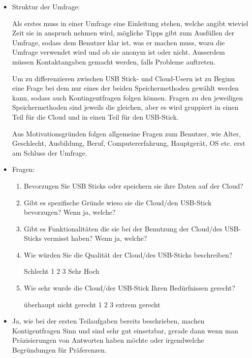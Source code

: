 \begin{itemize}

    \item Struktur der Umfrage:

    Als erstes muss in einer Umfrage eine Einleitung stehen, welche angibt wieviel
    Zeit sie in anspruch nehmen wird, mögliche Tipps gibt zum Ausfüllen der Umfrage,
    sodass dem Benutzer klar ist, was er machen muss, wozu die Umfrage verwendet wird
    und ob sie anonym ist oder nicht. Ausserdem müssen Kontaktangaben gemacht werden,
    falls Probleme auftreten. 

    Um zu differenzieren zwischen USB Stick- und Cloud-Usern ist zu Beginn eine Frage bei dem nur eines
    der beiden Speichermethoden gewählt werden kann, sodass auch Kontingentfragen folgen können.
    Fragen zu den jeweiligen Speichermethoden sind jeweils die gleichen, aber es wird
    gruppiert in einen Teil für die Cloud und in einen Teil für den USB-Stick.

    Aus Motivationsgründen folgen allgemeine Fragen zum Benutzer, wie Alter, Geschlecht, 
    Ausbildung, Beruf, Computererfahrung, Hauptgerät, OS etc. erst am Schluss der Umfrage.

    \item Fragen:
    
    \begin{enumerate}[label=\arabic*)]
        \item Bevorzugen Sie USB Sticks oder speichern sie ihre Daten auf der Cloud?
        \item Gibt es spezifische Gründe wieso sie die Cloud/den USB-Stick bevorzugen? Wenn ja, welche?
        \item Gibt es Funktionalitäten die sie bei der Benutzung der Cloud/des USB-Sticks vermisst haben? Wenn ja, welche?
        \item Wie würden Sie die Qualität der Cloud/des USB-Sticks beschreiben?

            Schlecht    1   2   3   Sehr Hoch
        \item Wie sehr wurde die Cloud/der USB-Stick Ihren Bedürfnissen gerecht?

            überhaupt nicht gerecht     1   2   3   extrem gerecht

    \end{enumerate}

    \item Ja, wie bei der ersten Teilaufgaben bereits beschrieben, machen
    Kontigentfragen Sinn und sind sehr gut einsetzbar, gerade dann wenn man Präzisierungen von Antworten 
    haben möchte oder irgendwelche Begründungen für Präferenzen.



\end{itemize}
